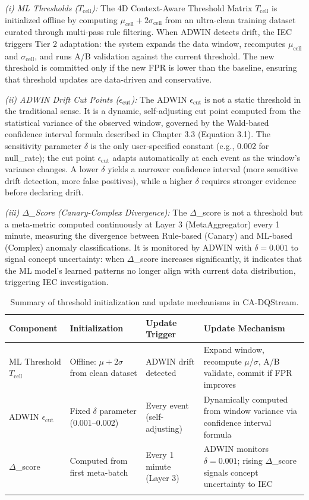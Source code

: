 \textit{(i) ML Thresholds ($T_{\text{cell}}$):} The 4D Context-Aware Threshold Matrix $T_{\text{cell}}$ is initialized offline by computing $\mu_{\text{cell}} + 2\sigma_{\text{cell}}$ from an ultra-clean training dataset curated through multi-pass rule filtering. When ADWIN detects drift, the IEC triggers Tier 2 adaptation: the system expands the data window, recomputes $\mu_{\text{cell}}$ and $\sigma_{\text{cell}}$, and runs A/B validation against the current threshold. The new threshold is committed only if the new FPR is lower than the baseline, ensuring that threshold updates are data-driven and conservative.

\textit{(ii) ADWIN Drift Cut Points ($\epsilon_{\text{cut}}$):} The ADWIN $\epsilon_{\text{cut}}$ is not a static threshold in the traditional sense. It is a dynamic, self-adjusting cut point computed from the statistical variance of the observed window, governed by the Wald-based confidence interval formula described in Chapter 3.3 (Equation 3.1). The sensitivity parameter $\delta$ is the only user-specified constant (e.g., 0.002 for null\_rate); the cut point $\epsilon_{\text{cut}}$ adapts automatically at each event as the window's variance changes. A lower $\delta$ yields a narrower confidence interval (more sensitive drift detection, more false positives), while a higher $\delta$ requires stronger evidence before declaring drift.

\textit{(iii) $\Delta$\_Score (Canary-Complex Divergence):} The $\Delta$\_score is not a threshold but a meta-metric computed continuously at Layer 3 (MetaAggregator) every 1 minute, measuring the divergence between Rule-based (Canary) and ML-based (Complex) anomaly classifications. It is monitored by ADWIN with $\delta=0.001$ to signal concept uncertainty: when $\Delta$\_score increases significantly, it indicates that the ML model's learned patterns no longer align with current data distribution, triggering IEC investigation.

\begin{longtable}{|m{2.5cm}|m{3cm}|m{2cm}|m{5cm}|}
\hline
\textbf{Component} & \textbf{Initialization} & \textbf{Update Trigger} & \textbf{Update Mechanism} \\ \hline
ML Threshold $T_{\text{cell}}$ & Offline: $\mu+2\sigma$ from clean dataset & ADWIN drift detected & Expand window, recompute $\mu$/$\sigma$, A/B validate, commit if FPR improves \\ \hline
ADWIN $\epsilon_{\text{cut}}$ & Fixed $\delta$ parameter (0.001--0.002) & Every event (self-adjusting) & Dynamically computed from window variance via confidence interval formula \\ \hline
$\Delta$\_score & Computed from first meta-batch & Every 1 minute (Layer 3) & ADWIN monitors $\delta=0.001$; rising $\Delta$\_score signals concept uncertainty to IEC \\ \hline
\caption{Summary of threshold initialization and update mechanisms in CA-DQStream.}
\label{tab:threshold_lifecycle}
\end{longtable}


